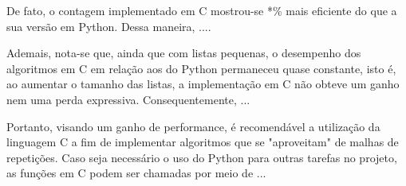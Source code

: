 De fato, o contagem implementado em C mostrou-se *\% mais eficiente do que a sua versão em Python. Dessa maneira, ....

Ademais, nota-se que, ainda que com listas pequenas, o desempenho dos algoritmos em C em relação aos do Python permaneceu quase constante, isto é, ao aumentar o tamanho das listas, a implementação em C não obteve um ganho nem uma perda expressiva. Consequentemente, ...

Portanto, visando um ganho de performance, é recomendável a utilização da linguagem C a fim de implementar algoritmos que se "aproveitam" de malhas de repetições.
Caso seja necessário o uso do Python para outras tarefas no projeto, as funções em C podem ser chamadas por meio de ...
